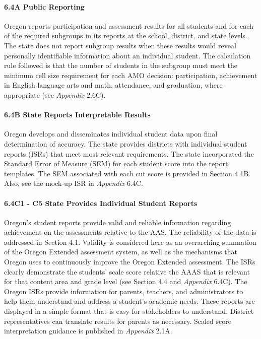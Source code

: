 \documentclass[]{article}
\let\oldparagraph\paragraph
\renewcommand{\paragraph}[1]{\oldparagraph{#1}\mbox{}}
\begin{document}
\paragraph{6.4A Public Reporting}\label{a-public-reporting}

Oregon reports participation and assessment results for all students and
for each of the required subgroups in its reports at the school,
district, and state levels. The state does not report subgroup results
when these results would reveal personally identifiable information
about an individual student. The calculation rule followed is that the
number of students in the subgroup must meet the minimum cell size
requirement for each AMO decision: participation, achievement in English
language arts and math, attendance, and graduation, where appropriate
(see \emph{Appendix} 2.6C).

\paragraph{6.4B State Reports Interpretable
Results}\label{b-state-reports-interpretable-results}

Oregon develops and disseminates individual student data upon final
determination of accuracy. The state provides districts with individual
student reports (ISRs) that meet most relevant requirements. The state
incorporated the Standard Error of Measure (SEM) for each student score
into the report templates. The SEM associated with each cut score is
provided in Section 4.1B. Also, see the mock-up ISR in \emph{Appendix}
6.4C.

\paragraph{6.4C1 - C5 State Provides Individual Student
Reports}\label{c1---c5-state-provides-individual-student-reports}

Oregon's student reports provide valid and reliable information
regarding achievement on the assessments relative to the AAS. The
reliability of the data is addressed in Section 4.1. Validity is
considered here as an overarching summation of the Oregon Extended
assessment system, as well as the mechanisms that Oregon uses to
continuously improve the Oregon Extended assessment. The ISRs clearly
demonstrate the students' scale score relative the AAAS that is relevant
for that content area and grade level (see Section 4.4 and
\emph{Appendix} 6.4C). The Oregon ISRs provide information for parents,
teachers, and administrators to help them understand and address a
student's academic needs. These reports are displayed in a simple format
that is easy for stakeholders to understand. District representatives
can translate results for parents as necessary. Scaled score
interpretation guidance is published in \emph{Appendix} 2.1A.
\end{document}
